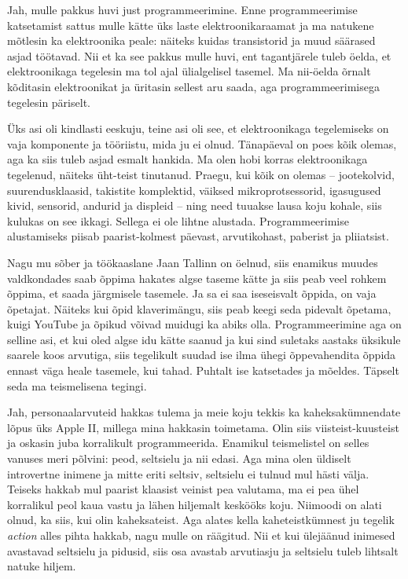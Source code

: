 
Jah, mulle pakkus huvi just programmeerimine. Enne programmeerimise katsetamist 
sattus mulle kätte üks laste 
elektroonikaraamat ja ma natukene mõtlesin ka
elektroonika peale: näiteks kuidas transistorid ja muud säärased asjad 
töötavad. 
Nii et ka see pakkus mulle huvi, ent tagantjärele tuleb öelda, et 
elektroonikaga tegelesin ma tol ajal ülialgelisel tasemel. Ma 
nii-öelda õrnalt kõditasin elektroonikat ja 
üritasin sellest aru saada, aga programmeerimisega tegelesin  
päriselt.


Üks asi oli kindlasti eeskuju, teine asi oli see, et 
elektroonikaga tegelemiseks on vaja komponente ja 
tööriistu, mida ju ei olnud. Tänapäeval on poes kõik 
olemas, aga ka siis tuleb asjad esmalt hankida. Ma olen hobi korras 
elektroonikaga tegelenud, näiteks üht-teist
tinutanud. Praegu, kui kõik on olemas -- jootekolvid, suurendusklaasid, 
takistite 
komplektid, väiksed mikroprotsessorid, igasugused kivid, sensorid, andurid 
ja displeid -- ning need tuuakse lausa koju kohale, siis kulukas on see ikkagi. 
Sellega ei ole lihtne alustada. Programmeerimise alustamiseks piisab 
paarist-kolmest päevast, arvutikohast, paberist ja pliiatsist.

Nagu mu sõber ja töökaaslane Jaan Tallinn on  
öelnud, siis enamikus muudes  
valdkondades saab õppima hakates 
algse taseme kätte ja siis peab veel rohkem õppima, et saada järgmisele 
tasemele. Ja sa ei saa iseseisvalt õppida,  
on vaja õpetajat. Näiteks kui õpid klaverimängu, siis peab keegi seda pidevalt 
õpetama, kuigi YouTube ja
õpikud võivad muidugi ka abiks olla. 
Programmeerimine aga on selline asi, et kui oled algse idu
kätte saanud ja kui sind suletaks aastaks üksikule saarele koos arvutiga, siis 
tegelikult suudad ise ilma ühegi õppevahendita õppida 
ennast väga heale tasemele, kui tahad. Puhtalt ise katsetades ja mõeldes. 
Täpselt seda ma teismelisena tegingi.


Jah, personaalarvuteid hakkas tulema ja meie koju tekkis ka kaheksakümnendate 
lõpus üks Apple 
II, millega mina hakkasin toimetama. Olin siis 
viisteist-kuusteist ja oskasin 
juba korralikult programmeerida. Enamikul teismelistel on selles vanuses meri 
põlvini: peod, seltsielu ja nii edasi. Aga mina 
olen üldiselt introvertne inimene ja mitte eriti seltsiv, seltsielu ei tulnud 
mul hästi välja. Teiseks hakkab mul 
paarist klaasist veinist pea valutama, ma ei pea 
ühel korralikul peol kaua vastu ja lähen hiljemalt 
keskööks koju. Niimoodi on alati olnud, ka siis, kui olin 
kaheksateist. Aga alates kella kaheteistkümnest ju tegelik 
\emph{action} alles pihta hakkab, nagu mulle on räägitud. Nii et kui ülejäänud 
inimesed avastavad seltsielu 
ja pidusid, siis osa avastab arvutiasju ja 
seltsielu tuleb lihtsalt natuke hiljem.

